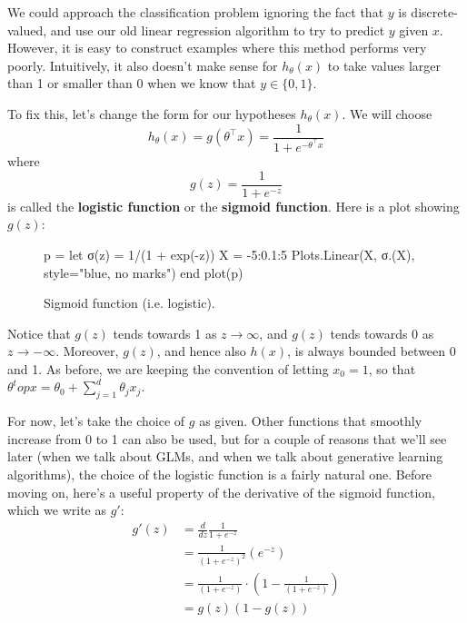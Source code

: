 We could approach the classification problem ignoring the fact that $y$ is
discrete-valued, and use our old linear regression algorithm to try to predict
$y$ given $x$. However, it is easy to construct examples where this method
performs very poorly. Intuitively, it also doesn't make sense for $h_\theta (x)$ to take
values larger than 1 or smaller than 0 when we know that $y \in \{0,1\}$.

To fix this, let's change the form for our hypotheses $h_\theta (x)$. We will choose
\[
h_\theta (x) = g(\theta^\top x) = \frac{1}{1 + e^{-\theta^\top x}}
\]
where
\[
g(z) = \frac{1}{1 + e^{-z}}
\]
is called the \textbf{logistic function} or the \textbf{sigmoid function}. Here is a plot
showing $g(z)$:

\begin{figure}
    \caption{
        \label{fig:sigmoid} Sigmoid function (i.e. logistic).
    }
    \begin{jlcode}
    p = let
        σ(z) = 1/(1 + exp(-z))
        X = -5:0.1:5
        Plots.Linear(X, σ.(X), style="blue, no marks")
    end
    plot(p)
    \end{jlcode}
    \begin{center}
    \end{center}
\end{figure}

Notice that $g(z)$ tends towards 1 as $z \to \infty$, and $g(z)$ tends towards 0 as
$z \to -\infty$. Moreover, $g(z)$, and hence also $h(x)$, is always bounded between
0 and 1. As before, we are keeping the convention of letting $x_0 = 1$, so that $\theta^top x = \theta_0 + \sum_{j=1}^{d} \theta_j x_j$.

For now, let's take the choice of $g$ as given. Other functions that smoothly
increase from 0 to 1 can also be used, but for a couple of reasons that we'll see
later (when we talk about GLMs, and when we talk about generative learning
algorithms), the choice of the logistic function is a fairly natural one. Before
moving on, here's a useful property of the derivative of the sigmoid function,
which we write as $g'$:
\begin{align}
    g'(z) &= \frac{d}{dz}\frac{1}{1 + e^{-z}}\\
    &= \frac{1}{(1 + e^{-z})^2} (e^{-z})\\
    &= \frac{1}{(1 + e^{-z})} \cdot \left( 1 - \frac{1}{(1 + e^{-z})} \right)\\
    &= g(z)(1 - g(z))
\end{align}

